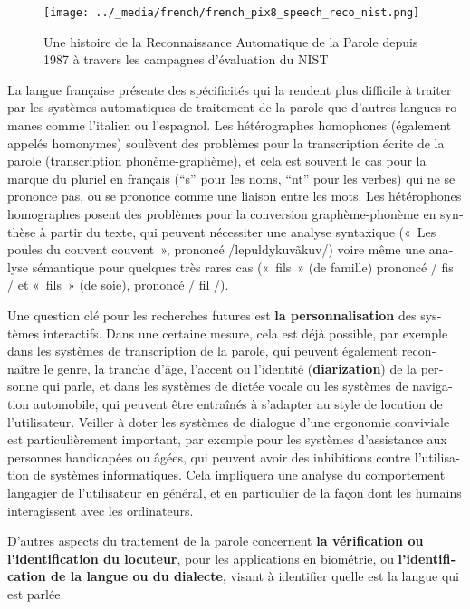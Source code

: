 \begin{french}
\begin{multicols}{2}
\begin{figure}[!ht]
\begin{center}
  \texttt{[image: ../\_media/french/french\_pix8\_speech\_reco\_nist.png]}
  \caption{Une histoire de la Reconnaissance Automatique de la Parole depuis 1987 à travers les campagnes d'évaluation du NIST~\cite{speechreconist}}
  \label{fig:nistreco}
\end{center}
\end{figure}

La langue française présente des spécificités qui la rendent plus
difficile à traiter par les systèmes automatiques de traitement de la
parole que d'autres langues romanes comme l'italien ou l'espagnol. Les
hétérographes homophones (également appelés homonymes) soulèvent des
problèmes pour la transcription écrite de la parole (transcription
phonème-graphème), et cela est souvent le cas pour la marque du
pluriel en français (``s'' pour les noms, ``nt'' pour les verbes) qui
ne se prononce pas, ou se prononce comme une liaison entre les
mots. Les hétérophones homographes posent des problèmes pour la
conversion graphème-phonème en synthèse à partir du texte, qui peuvent
nécessiter une analyse syntaxique («~Les poules du couvent couvent~»,
prononcé /lepuldykuvãkuv/) voire même une analyse sémantique pour
quelques très rares cas («~fils~» (de famille) prononcé / fis / et
«~fils~» (de soie), prononcé / fil /).

Une question clé pour les recherches futures est {\bf la personnalisation}
des systèmes interactifs. Dans une certaine mesure, cela est déjà
possible, par exemple dans les systèmes de transcription de la parole,
qui peuvent également reconnaître le genre, la tranche d'âge, l'accent
ou l'identité ({\bf diarization}) de la personne qui parle, et dans les
systèmes de dictée vocale ou les systèmes de navigation automobile,
qui peuvent être entraînés à s'adapter au style de locution de
l'utilisateur. Veiller à doter les systèmes de dialogue d'une ergonomie
conviviale est particulièrement important, par exemple pour les systèmes
d'assistance aux personnes handicapées ou âgées, qui peuvent avoir des
inhibitions contre l'utilisation de systèmes informatiques. Cela
impliquera une analyse du comportement langagier de l'utilisateur en
général, et en particulier de la façon dont les humains interagissent
avec les ordinateurs.

D'autres aspects du traitement de la parole concernent {\bf la vérification
ou l'identification du locuteur}, pour les applications en biométrie,
ou {\bf l'identification de la langue ou du dialecte}, visant à identifier
quelle est la langue qui est parlée.


\end{multicols}
\end{french}
